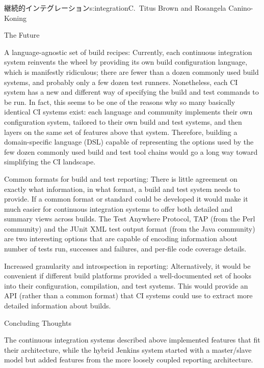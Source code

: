 \begin{aosachapter}{継続的インテグレーション}{s:integration}{C.\ Titus Brown and Rosangela Canino-Koning}
\begin{aosasect1}{The Future}
\begin{aosadescription}
  \item{A language-agnostic set of build recipes:} Currently,
  each continuous integration system reinvents the wheel by
  providing its own build configuration language, which is
  manifestly ridiculous; there are fewer than a dozen commonly used
  build systems, and probably only a few dozen test
  runners. Nonetheless, each CI system has a new and different way
  of specifying the build and test commands to be run. In fact, this
  seems to be one of the reasons why so many basically identical CI
  systems exist: each language and community implements their own
  configuration system, tailored to their own build and test
  systems, and then layers on the same set of features above that
  system. Therefore, building a domain-specific language (DSL)
  capable of representing the options used by the few dozen commonly
  used build and test tool chains would go a long way toward
  simplifying the CI landscape.

  \item{Common formats for build and test reporting:} There is
  little agreement on exactly what information, in what format, a
  build and test system needs to provide. If a common format or
  standard could be developed it would make it much easier for
  continuous integration systems to offer both detailed and summary
  views across builds. The Test Anywhere Protocol, TAP (from the
  Perl community) and the JUnit XML test output format (from the
  Java community) are two interesting options that are capable of
  encoding information about number of tests run, successes and
  failures, and per-file code coverage details.

  \item{Increased granularity and introspection in reporting:}
  Alternatively, it would be convenient if different build platforms
  provided a well-documented set of hooks into their configuration,
  compilation, and test systems. This would provide an API (rather
  than a common format) that CI systems could use to extract more
  detailed information about builds.

\end{aosadescription}

\begin{aosasect2}{Concluding Thoughts}

The continuous integration systems described above implemented
features that fit their architecture, while the hybrid Jenkins system
started with a master/slave model but added features from the more
loosely coupled reporting architecture.


\end{aosasect2}
\end{aosasect1}
\end{aosachapter}
